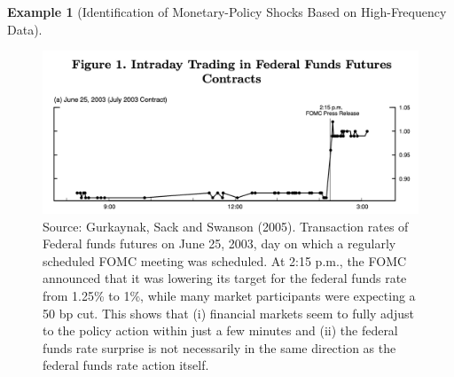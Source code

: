 \documentclass[
  12pt,
]{book}
\theoremstyle{definition}
\theoremstyle{definition}
\newtheorem{example}{Example}[chapter]
\theoremstyle{definition}
\theoremstyle{definition}
\theoremstyle{remark}
\begin{document}
\begin{example}[Identification of Monetary-Policy Shocks Based on High-Frequency Data]
\begin{figure}
\includegraphics[width=0.95\linewidth]{images/GSS2005_HFI} \caption{Source: Gurkaynak, Sack and Swanson (2005). Transaction rates of Federal funds futures on June 25, 2003, day on which a regularly scheduled FOMC meeting was scheduled. At 2:15 p.m., the FOMC announced that it was lowering its target for the federal funds rate from 1.25\% to 1\%, while many market participants were expecting a 50 bp cut. This shows that (i) financial markets seem to fully adjust to the policy action within just a few minutes and (ii) the federal funds rate surprise is not necessarily in the same direction as the federal funds rate action itself.}\label{fig:HighFreq}
\end{figure}

\end{example}
\end{document}

